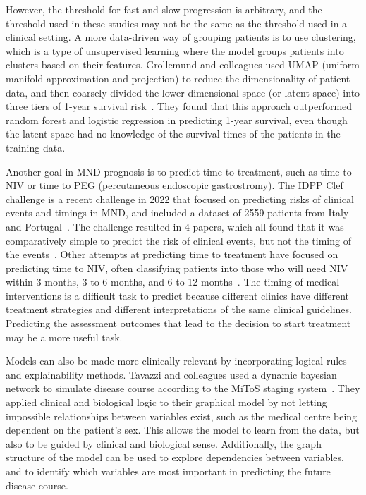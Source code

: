 However, the threshold for fast and slow progression is arbitrary, and the threshold used in these studies may not be the same as the threshold used in a clinical setting.
A more data-driven way of grouping patients is to use clustering, which is a type of unsupervised learning where the model groups patients into clusters based on their features.
Grollemund and colleagues used UMAP (uniform manifold approximation and projection) to reduce the dimensionality of patient data, and then coarsely divided the lower-dimensional space (or latent space) into three tiers of 1-year survival risk~\cite{grollemundDevelopmentValidation1year2020}.
They found that this approach outperformed random forest and logistic regression in predicting 1-year survival, even though the latent space had no knowledge of the survival times of the patients in the training data.

Another goal in MND prognosis is to predict time to treatment, such as time to NIV or time to PEG (percutaneous endoscopic gastrostromy).
The IDPP Clef challenge is a recent challenge in 2022 that focused on predicting risks of clinical events and timings in MND, and included a dataset of 2559 patients from Italy and Portugal~\cite{guazzoOverviewIDPPCLEF2022}.
The challenge resulted in 4 papers, which all found that it was comparatively simple to predict the risk of clinical events, but not the timing of the events~\cite{brancoHierarchicalModellingALS2022, mannionPredictingRiskTime2022, trescatoBaselineMachineLearning2022, pancottiMultiEventSurvivalPrediction2022}.
Other attempts at predicting time to treatment have focused on predicting time to NIV, often classifying patients into those who will need NIV within 3 months, 3 to 6 months, and 6 to 12 months~\cite{carreiroPrognosticModelsBased2015, pereiraPredictingAssistedVentilation2019}.
The timing of medical interventions is a difficult task to predict because different clinics have different treatment strategies and different interpretations of the same clinical guidelines.
Predicting the assessment outcomes that lead to the decision to start treatment may be a more useful task.

Models can also be made more clinically relevant by incorporating logical rules and explainability methods.
Tavazzi and colleagues used a dynamic bayesian network to simulate disease course according to the MiToS staging system~\cite{tavazziPredictingFunctionalImpairment2022}.
They applied clinical and biological logic to their graphical model by not letting impossible relationships between variables exist, such as the medical centre being dependent on the patient's sex.
This allows the model to learn from the data, but also to be guided by clinical and biological sense.
Additionally, the graph structure of the model can be used to explore dependencies between variables, and to identify which variables are most important in predicting the future disease course.

